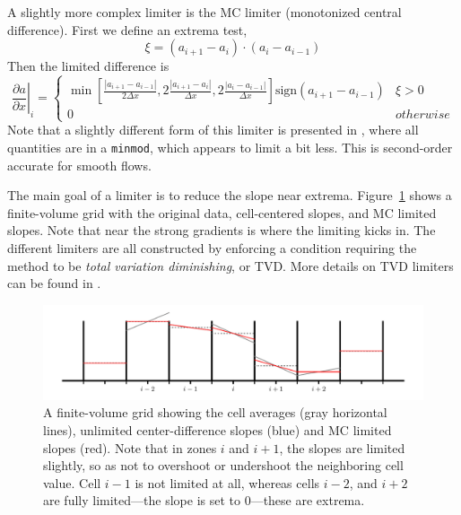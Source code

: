 A slightly more complex limiter is the MC limiter (monotonized central
difference).  First we define an extrema test,
\begin{equation}
\xi = (a_{i+1} - a_i) \cdot (a_i - a_{i-1})
\end{equation}
Then the limited difference is
\begin{equation}
\left . \frac{\partial a}{\partial x} \right |_i = 
 \left \{
\begin{array}{ll}
\min \left [ \frac{| a_{i+1} - a_{i-1} |}{2 \Delta x},
              2 \frac{| a_{i+1} - a_i |}{\Delta x},
              2 \frac{| a_{i} - a_{i-1} |}{\Delta x}
      \right ]  \mathrm{sign}(a_{i+1} - a_{i-1}) &  \xi > 0 \\
0 & \mathit{otherwise}
\end{array}
\right .
\end{equation}
%
Note that a slightly different form of this limiter is presented in
\cite{leveque:2002}, where all quantities are in a {\tt minmod}, which appears to limit a bit less.
This is second-order accurate for smooth flows.  

The main goal of a limiter is to reduce the slope near extrema.
Figure~\ref{fig:limit} shows a finite-volume grid with the original
data, cell-centered slopes, and MC limited slopes.  Note that near the
strong gradients is where the limiting kicks in.  The different limiters
are all constructed by enforcing a condition requiring the method to be
{\em total variation diminishing}, or TVD.  More details on TVD limiters
can be found in \cite{toro:1997,leveque:2002}.

\begin{figure}
\centering
\includegraphics[width=\linewidth]{generalgrid}
\caption[Piecewise linear slopes with an without
  limiting.]{\label{fig:limit} A finite-volume grid showing the cell
  averages (gray horizontal lines), unlimited center-difference slopes
  (blue) and MC limited slopes (red).  Note that in zones $i$ and
  $i+1$, the slopes are limited slightly, so as not to overshoot or
  undershoot the neighboring cell value.  Cell $i-1$ is not limited at
  all, whereas cells $i-2$, and $i+2$ are fully limited---the slope is
  set to 0---these are extrema.}
\end{figure}

